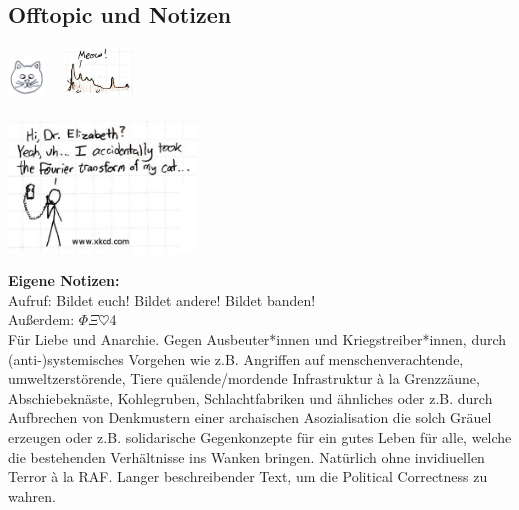 \documentclass[fs, footer]{latex4ei}
\begin{document}
\begin{multicols*}{4}
{}


\sectionbox{
	\subsection{}

}





\columnbreak


\section{Offtopic und Notizen}
 \qquad \includegraphics[height = 1cm]{./img/cat.jpg} \ \raisebox{0.5cm}{$\FT$}\ \includegraphics[height = 1.3cm]{./img/cat_f.jpg}\\
\\
\includegraphics[width = 5cm]{./img/xkcd2.jpg}


\vspace{0.2cm}
{\Huge \bf Eigene Notizen:}\\

Aufruf: Bildet euch! Bildet andere! Bildet banden! \\
Außerdem: $\Phi \Xi \heartsuit$4\CircledA \\ %
Für Liebe und Anarchie. Gegen Ausbeuter*innen und Kriegstreiber*innen, durch (anti-)systemisches Vorgehen wie z.B. Angriffen auf menschenverachtende, umweltzerstörende, Tiere quälende/mordende Infrastruktur à la Grenzzäune, Abschiebeknäste, Kohlegruben, Schlachtfabriken und ähnliches oder z.B. durch Aufbrechen von Denkmustern einer archaischen Asozialisation die solch Gräuel erzeugen oder z.B. solidarische Gegenkonzepte für ein gutes Leben für alle, welche die bestehenden Verhältnisse ins Wanken bringen. Natürlich ohne invidiuellen Terror à la RAF. Langer beschreibender Text, um die Political Correctness zu wahren.\\


\end{multicols*}
\end{document}
